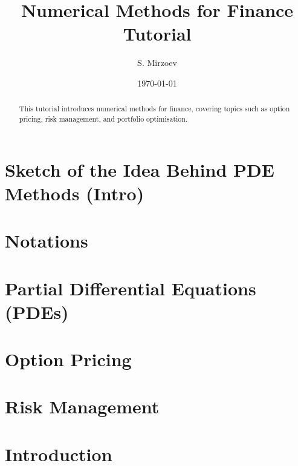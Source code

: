 \documentclass{article}
\title{Numerical Methods for Finance Tutorial}
\author{S. Mirzoev}
\date{\today}
\begin{document}
\maketitle

\begin{abstract}
This tutorial introduces numerical methods for finance, covering topics such as option pricing, risk management, and portfolio optimisation.
\end{abstract}

\section{Sketch of the Idea Behind PDE Methods (Intro)}


\section{Notations}


\section{Partial Differential Equations (PDEs)}


\section{Option Pricing}
% 

\section{Risk Management}
% 


\section{Introduction}
\end{document}
